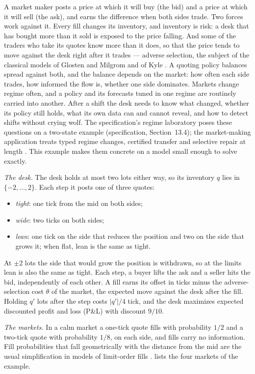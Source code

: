 \documentclass[11pt]{article}
\newcommand{\spec}[1]{specification, Section~#1}
\theoremstyle{definition}
\theoremstyle{plain}
\begin{document}
A market maker posts a price at which it will buy (the bid) and a price at which it will sell (the
ask), and earns the difference when both sides trade. Two forces work against it. Every fill changes
its inventory, and inventory is risk: a desk that has bought more than it sold is exposed to the
price falling. And some of the traders who take its quotes know more than it does, so that the
price tends to move against the desk right after it trades --- adverse selection, the subject of
the classical models of Glosten and Milgrom \cite{glosten} and of Kyle \cite{kyle}. A quoting policy
balances spread against both, and the balance depends on the market: how often each side trades,
how informed the flow is, whether one side dominates. Markets change regime often, and a policy and
its forecasts tuned in one regime are routinely carried into another. After a shift the desk needs
to know what changed, whether its policy still holds, what its own data can and cannot reveal, and
how to detect shifts without crying wolf. The specification's regime laboratory poses these
questions on a two-state example (\spec{13.4}); the market-making application treats typed regime
changes, certified transfer and selective repair at length \cite{marketmaking}. This example makes
them concrete on a model small enough to solve exactly.

\emph{The desk.} The desk holds at most two lots either way, so its inventory $q$ lies in
$\{-2,\dots,2\}$. Each step it posts one of three quotes:
\begin{itemize}
\item \emph{tight}: one tick from the mid on both sides;
\item \emph{wide}: two ticks on both sides;
\item \emph{lean}: one tick on the side that reduces the position and two on the side that grows it;
when flat, lean is the same as tight.
\end{itemize}
At $\pm2$ lots the side that would grow the position is withdrawn, so at the limits lean is also the
same as tight. Each step, a buyer lifts the ask and a seller hits the bid, independently of each
other. A fill earns its offset in ticks minus the adverse-selection cost $\theta$ of the market, the
expected move against the desk after the fill. Holding $q'$ lots after the step costs $|q'|/4$ tick,
and the desk maximizes expected discounted profit and loss (P\&L) with discount $9/10$.

\emph{The markets.} In a calm market a one-tick quote fills with probability $1/2$ and a two-tick
quote with probability $1/8$, on each side, and fills carry no information. Fill probabilities that fall
geometrically with the distance from the mid are the usual simplification in models of limit-order
fills \cite{avellaneda}. 
lists the four markets of the example.
\end{document}
